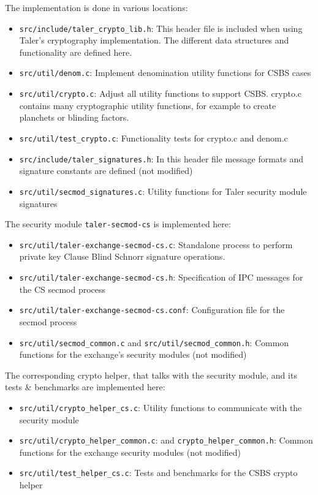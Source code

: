 The implementation is done in various locations:
\begin{itemize}
    \item \texttt{src/include/taler\_crypto\_lib.h}: This header file is included when using Taler's cryptography implementation.
    The different data structures and functionality are defined here.
    \item \texttt{src/util/denom.c}: Implement denomination utility functions for \gls{CSBS} cases
    \item \texttt{src/util/crypto.c}: Adjust all utility functions to support \gls{CSBS}.
    crypto.c contains many cryptographic utility functions, for example to create planchets or blinding factors.
    \item \texttt{src/util/test\_crypto.c}: Functionality tests for crypto.c and denom.c
    \item \texttt{src/include/taler\_signatures.h}: In this header file message formats and signature constants are defined (not modified)
    \item \texttt{src/util/secmod\_signatures.c}: Utility functions for Taler security module signatures
\end{itemize}

The security module \texttt{taler-secmod-cs} is implemented here:
\begin{itemize}
    \item \texttt{src/util/taler-exchange-secmod-cs.c}: Standalone process to perform private key Clause Blind Schnorr signature operations.
    \item \texttt{src/util/taler-exchange-secmod-cs.h}: Specification of \ac{IPC} messages for the CS secmod process
    \item \texttt{src/util/taler-exchange-secmod-cs.conf}: Configuration file for the secmod process
    \item \texttt{src/util/secmod\_common.c} and \texttt{src/util/secmod\_common.h}: Common functions for the exchange's security modules (not modified)
\end{itemize}

The corresponding crypto helper, that talks with the security module, and its tests \& benchmarks are implemented here:
\begin{itemize}
    \item \texttt{src/util/crypto\_helper\_cs.c}: Utility functions to communicate with the security module
    \item \texttt{src/util/crypto\_helper\_common.c}: and \texttt{crypto\_helper\_common.h}: Common functions for the exchange security modules (not modified)
    \item \texttt{src/util/test\_helper\_cs.c}: Tests and benchmarks for the \gls{CSBS} crypto helper
\end{itemize}


